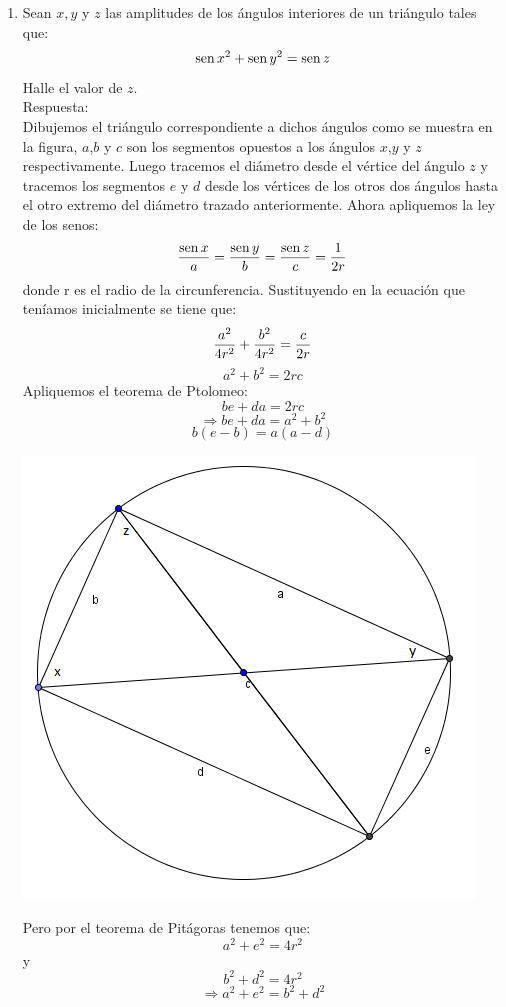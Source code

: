 \documentclass{book}
\newcommand{\sen}{\mathop{\rm sen}\nolimits} %
\begin{document}
\begin{enumerate}
    \item Sean $x,y$ y $z$ las amplitudes de los ángulos interiores de un triángulo tales que:
          $$\sen{x^2}+\sen{y^2}=\sen{z}$$
          Halle el valor de $z$. \\
          Respuesta:\\
          Dibujemos el triángulo correspondiente a dichos ángulos como se muestra en la figura, $a$,$b$ y $c$ son los segmentos opuestos a los ángulos $x$,$y$ y $z$ respectivamente. Luego tracemos el diámetro desde el vértice del ángulo $z$ y tracemos los segmentos $e$ y $d$ desde los vértices de los otros dos ángulos hasta el otro extremo del diámetro trazado anteriormente.
          Ahora apliquemos la ley de los senos:
          $${\sen {x}\over a}={\sen {y}\over b}={\sen {z}\over c}={1\over 2r}$$
          donde r es el radio de la circunferencia.
          Sustituyendo en la ecuación que teníamos inicialmente se tiene que:
          $${a^2\over 4r^2} +{b^2\over 4r^2} ={c\over 2r}$$
          $$a^2+b^2=2rc$$
          Apliquemos el teorema de Ptolomeo:
          $$be+da=2rc$$
          $$\Rightarrow be+da=a^2+b^2$$
          $$b(e-b)=a(a-d)$$
          \begin{center}
              \includegraphics[scale=1]{imagenes/Geometria/9.png}
          \end{center}
          Pero por el teorema de Pitágoras tenemos que:
          $$a^2+e^2=4r^2$$
          y
          $$b^2+d^2=4r^2$$
          $$\Rightarrow a^2+e^2=b^2+d^2$$

\end{enumerate}
\end{document}
